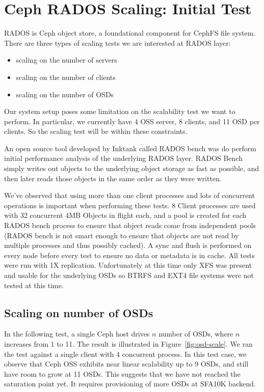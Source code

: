 \documentclass{article}
\begin{document}
\section{Ceph RADOS Scaling: Initial Test}

RADOS is Ceph object store, a foundational component for CephFS file
system. There are three types of scaling tests we are interested at RADOS layer:

\begin{itemize}
  \item scaling on the number of servers
  \item scaling on the number of clients
  \item scaling on the number of OSDs
\end{itemize}

Our system setup poses some limitation on the scalability test we want to
perform. In particular, we currently have 4 OSS server, 8 clients, and 11 OSD
per clients. So the scaling test will be within these constraints. 

An open source tool developed by Inktank called RADOS bench was do perform
initial performance analysis of the underlying RADOS layer.  RADOS Bench simply
writes out objects to the underlying object storage as fast as possible, and
then later reads those objects in the same order as they were written.

We've observed that using more than one client processes and lots of concurrent
operations is important when performing these tests.  8 Client processes are
used with 32 concurrent 4MB Objects in flight each, and a pool is created for
each RADOS bench process to ensure that object reads come from independent pools
(RADOS bench is not smart enough to ensure that objects are not read by multiple
processes and thus possibly cached).  A sync and flush is performed on every
node before every test to ensure no data or metadata is in cache.  All tests
were run with 1X replication.  Unfortunately at this time only XFS was present
and usable for the underlying OSDs so BTRFS and EXT4 file systems were not
tested at this time.


\subsection{Scaling on number of OSDs}

In the following test, a single Ceph host drives $n$ number of OSDs, where $n$
increases from 1 to 11. The result is illustrated in Figure~\ref{fig:osd-scale}.
We ran the test against a single client with 4 concurrent process. In this test
case, we observe that Ceph OSS exhibits near linear scalability up to 9
OSDs, and still have room to grow at 11 OSDs. This suggests that we have not reached the
saturation point yet. It requires provisioning of more OSDs at SFA10K backend.
\end{document}
